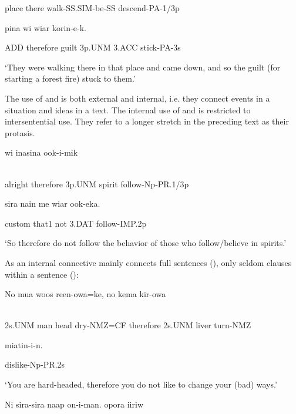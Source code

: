 place  there  walk-SS.SIM-be-SS  descend-PA-1/3p

    pina  wi  wiar  korin-e-k.

ADD  therefore  guilt  3p.UNM  3.ACC  stick-PA-3s

`They were walking there in that place and came down, and so the guilt (for starting a forest fire) stuck to them.'

The use of  and  is both external and internal, i.e. they connect events in a situation and ideas in a text. The internal use of  and  is restricted to intersentential use. They refer to a longer stretch in the preceding text as their protasis.

\ea%
\label{ex:x1407}
\gll {}    wi  inasina  ook-i-mik   \\
      \\
\glt
\z

alright  therefore  3p.UNM  spirit  follow-Np-PR.1/3p  

sira  nain  me  wiar  ook-eka.

custom  that1  not  3.DAT  follow-IMP.2p

`So therefore do not follow the behavior of those who follow/believe in spirits.'

As an internal connective  mainly connects full sentences (), only seldom clauses within a sentence ():

\ea%
\label{ex:x1410}
\gll No  mua  woos  reen-owa=ke,    no  kema  kir-owa \\
      \\
\glt
\z

2s.UNM  man  head  dry-NMZ=CF  therefore  2s.UNM  liver  turn-NMZ

miatin-i-n.

dislike-Np-PR.2s

`You are hard-headed, therefore you do not like to change your (bad) ways.'

\ea%
\label{ex:x1411}
\gll Ni  sira-sira  naap  on-i-man.    opora  iiriw \\
      \\
\glt
\z

